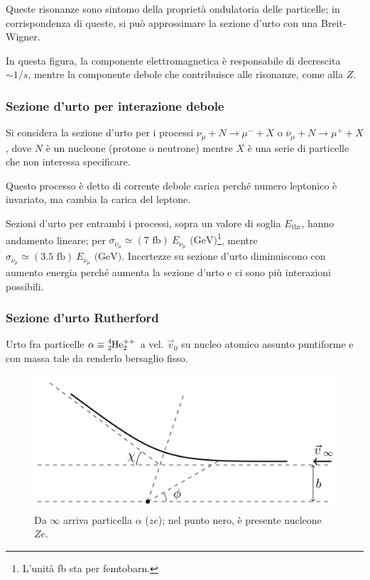 \documentclass[10pt, a4paper]{scrartcl}
\numberwithin{equation}{subsection}
\theoremstyle{style1}
\begin{document}
\noindent Queste risonanze sono sintomo della propriet\`a ondulatoria delle particelle; in corrispondenza di queste, si pu\`o approssimare la sezione d'urto con una Breit-Wigner.

In questa figura, la componente elettromagnetica \`e responsabile di decrescita $\sim 1 / s$, mentre la componente debole che contribuisce alle risonanze, come alla $Z$.


\subsubsection{Sezione d'urto per interazione debole}
Si considera la sezione d'urto per i processi $\nu _\mu  + N \to \mu ^- +X$ o $\overline{\nu }_\mu  + N \to \mu ^+ + X$, dove $N$ \`e un nucleone (protone o neutrone) mentre $X$ \`e una serie di particelle che non interessa specificare. 

Questo processo \`e detto di corrente debole carica perch\'e numero leptonico \`e invariato, ma cambia la carica del leptone. 


Sezioni d'urto per entrambi i processi, sopra un valore di soglia $E_\text{thr}$, hanno andamento lineare; per $\sigma _{\nu _\mu } \simeq (7 \text{ fb})\ E_{\nu _\mu }   \text{ (GeV)} $\footnote{L'unit\`a fb sta per femtobarn.}, mentre $\sigma _{\overline{\nu }_\mu } \simeq (3.5 \text{ fb}) \ E_{\overline{\nu }_\mu }  \text{ (GeV)}$. Incertezze su sezione d'urto diminuiscono con aumento energia perch\'e aumenta la sezione d'urto e ci sono pi\`u interazioni possibili.

\subsubsection{Sezione d'urto Rutherford}

Urto fra particelle $\alpha  \equiv \ce{_2^4He^{++}_2 }$ a vel. $\vec{v}_0$ su nucleo atomico assunto puntiforme e con massa tale da renderlo bersaglio fisso.
\begin{figure}[h!]
	\centering
	\includegraphics[width=.5\columnwidth]{ruth.png}
	\caption{Da $\infty$ arriva particella $\alpha $ ($ze$); nel punto nero, \`e presente nucleone $Ze$.}
\end{figure}
\end{document}
